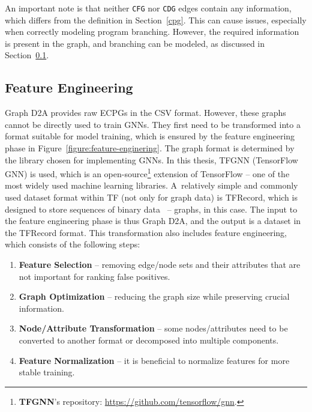 An important note is that neither \texttt{CFG} nor \texttt{CDG} edges contain any information, which differs from the definition in Section~\ref{cpg}. This can cause issues, especially when correctly modeling program branching. However, the required information is present in the graph, and branching can be modeled, as discussed in Section~\ref{feature-engineering}.


\subsection{Feature Engineering}
\label{feature-engineering}
Graph D2A provides raw ECPGs in the CSV format. However, these graphs cannot be directly used to train GNNs. They first need to be transformed into a format suitable for model training, which is ensured by the feature engineering phase in Figure~\ref{figure:feature-enginering}. The graph format is determined by the library chosen for implementing GNNs. In this thesis, TFGNN (TensorFlow GNN) is used, which is an open-source\footnote{\textbf{TFGNN}'s repository: \url{https://github.com/tensorflow/gnn}.} extension of TensorFlow -- one of the most widely used machine learning libraries. A~relatively simple and commonly used dataset format within TF (not only for graph data) is TFRecord, which is designed to store sequences of binary data~\cite{tfrecord} -- graphs, in this case. The input to the feature engineering phase is thus Graph D2A, and the output is a dataset in the TFRecord format. This transformation also includes feature engineering, which consists of the following steps:

\begin{enumerate}
    \item \textbf{Feature Selection} -- removing edge/node sets and their attributes that are not important for ranking false positives.
    \item \textbf{Graph Optimization} -- reducing the graph size while preserving crucial information.
    \item \textbf{Node/Attribute Transformation} -- some nodes/attributes need to be converted to another format or decomposed into multiple components.
    \item \textbf{Feature Normalization} -- it is beneficial to normalize features for more stable training.
\end{enumerate}

